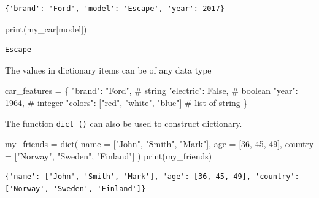 \documentclass[
  letterpaper,
  DIV=11,
  numbers=noendperiod]{scrreprt}
\newenvironment{Shaded}{\begin{snugshade}}{\end{snugshade}}
\newcommand{\BuiltInTok}[1]{\textcolor[rgb]{0.00,0.23,0.31}{#1}}
\newcommand{\CommentTok}[1]{\textcolor[rgb]{0.37,0.37,0.37}{#1}}
\newcommand{\DecValTok}[1]{\textcolor[rgb]{0.68,0.00,0.00}{#1}}
\newcommand{\NormalTok}[1]{\textcolor[rgb]{0.00,0.23,0.31}{#1}}
\newcommand{\OperatorTok}[1]{\textcolor[rgb]{0.37,0.37,0.37}{#1}}
\newcommand{\StringTok}[1]{\textcolor[rgb]{0.13,0.47,0.30}{#1}}
\newcommand{\VariableTok}[1]{\textcolor[rgb]{0.07,0.07,0.07}{#1}}
\begin{document}
\begin{verbatim}
{'brand': 'Ford', 'model': 'Escape', 'year': 2017}
\end{verbatim}

\begin{Shaded}
\begin{Highlighting}[]
\BuiltInTok{print}\NormalTok{(my\_car[}\StringTok{\textquotesingle{}model\textquotesingle{}}\NormalTok{])}
\end{Highlighting}
\end{Shaded}

\begin{verbatim}
Escape
\end{verbatim}

The values in dictionary items can be of any data type

\begin{Shaded}
\begin{Highlighting}[]
\NormalTok{car\_features }\OperatorTok{=}\NormalTok{ \{}
  \StringTok{"brand"}\NormalTok{: }\StringTok{"Ford"}\NormalTok{, }\CommentTok{\# string }
  \StringTok{"electric"}\NormalTok{: }\VariableTok{False}\NormalTok{, }\CommentTok{\# boolean }
  \StringTok{"year"}\NormalTok{: }\DecValTok{1964}\NormalTok{, }\CommentTok{\# integer}
  \StringTok{"colors"}\NormalTok{: [}\StringTok{"red"}\NormalTok{, }\StringTok{"white"}\NormalTok{, }\StringTok{"blue"}\NormalTok{] }\CommentTok{\# list of string}
\NormalTok{\}}
\end{Highlighting}
\end{Shaded}

The function \texttt{dict\ ()} can also be used to construct dictionary.

\begin{Shaded}
\begin{Highlighting}[]
\NormalTok{my\_friends }\OperatorTok{=} \BuiltInTok{dict}\NormalTok{(}
\NormalTok{    name }\OperatorTok{=}\NormalTok{ [}\StringTok{"John"}\NormalTok{, }\StringTok{"Smith"}\NormalTok{, }\StringTok{"Mark"}\NormalTok{], }
\NormalTok{    age }\OperatorTok{=}\NormalTok{ [}\DecValTok{36}\NormalTok{, }\DecValTok{45}\NormalTok{, }\DecValTok{49}\NormalTok{], }
\NormalTok{    country }\OperatorTok{=}\NormalTok{ [}\StringTok{"Norway"}\NormalTok{, }\StringTok{"Sweden"}\NormalTok{, }\StringTok{"Finland"}\NormalTok{]}
\NormalTok{)}
\BuiltInTok{print}\NormalTok{(my\_friends)}
\end{Highlighting}
\end{Shaded}

\begin{verbatim}
{'name': ['John', 'Smith', 'Mark'], 'age': [36, 45, 49], 'country': ['Norway', 'Sweden', 'Finland']}
\end{verbatim}
\end{document}
